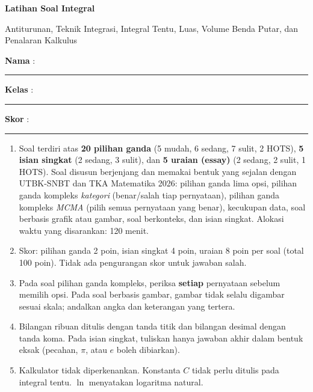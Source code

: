 \documentclass[a4paper,11pt]{article}
\newcounter{no}
\begin{document}
\thispagestyle{fancy}

\begin{center}
  {\color{mainc}\fontsize{22}{26}\selectfont\bfseries Latihan Soal Integral\par}
  \vspace{2pt}
  {\color{accc}\large Antiturunan, Teknik Integrasi, Integral Tentu, Luas, Volume Benda Putar, dan Penalaran Kalkulus\par}
\end{center}
\vspace{2pt}
\begin{tcolorbox}[colback=softbg,colframe=mainc!40,boxrule=0.6pt,arc=3pt,left=8pt,right=8pt,top=5pt,bottom=5pt]
\noindent\textbf{Nama} : \rule{4.6cm}{0.4pt}\hfill\textbf{Kelas} : \rule{2.2cm}{0.4pt}\hfill\textbf{Skor} : \rule{2.2cm}{0.4pt}
\end{tcolorbox}
\vspace{2pt}
\begin{tcolorbox}[colback=white,colframe=accc,boxrule=0.8pt,arc=3pt,left=8pt,right=8pt,top=4pt,bottom=4pt,title={\bfseries Petunjuk Pengerjaan},coltitle=white,fonttitle=\small]
\small
\begin{enumerate}[leftmargin=1.4em,itemsep=1pt,topsep=1pt]
\item Soal terdiri atas \textbf{20 pilihan ganda} (5 mudah, 6 sedang, 7 sulit, 2 HOTS), \textbf{5 isian singkat} (2 sedang, 3 sulit), dan \textbf{5 uraian (essay)} (2 sedang, 2 sulit, 1 HOTS). Soal disusun berjenjang dan memakai bentuk yang sejalan dengan UTBK-SNBT dan TKA Matematika 2026: pilihan ganda lima opsi, pilihan ganda kompleks \emph{kategori} (benar/salah tiap pernyataan), pilihan ganda kompleks \emph{MCMA} (pilih semua pernyataan yang benar), kecukupan data, soal berbasis grafik atau gambar, soal berkonteks, dan isian singkat. Alokasi waktu yang disarankan: 120 menit.
\item Skor: pilihan ganda 2 poin, isian singkat 4 poin, uraian 8 poin per soal (total 100 poin). Tidak ada pengurangan skor untuk jawaban salah.
\item Pada soal pilihan ganda kompleks, periksa \textbf{setiap} pernyataan sebelum memilih opsi. Pada soal berbasis gambar, gambar tidak selalu digambar sesuai skala; andalkan angka dan keterangan yang tertera.
\item Bilangan ribuan ditulis dengan tanda titik dan bilangan desimal dengan tanda koma. Pada isian singkat, tuliskan hanya jawaban akhir dalam bentuk eksak (pecahan, $\pi$, atau $e$ boleh dibiarkan).
\item Kalkulator tidak diperkenankan. Konstanta $C$ tidak perlu ditulis pada integral tentu. $\ln$ menyatakan logaritma natural.
\end{enumerate}
\end{tcolorbox}
\end{document}
